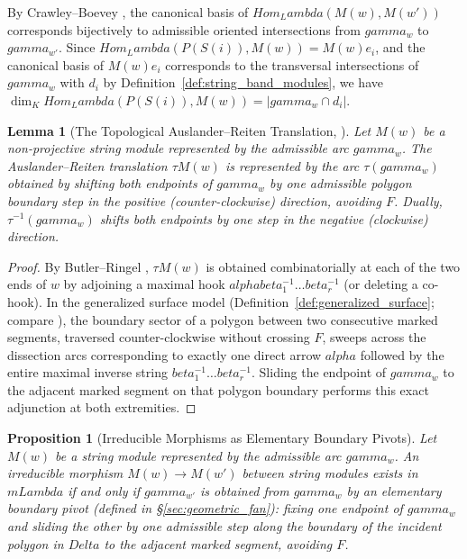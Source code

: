 \documentclass[11pt,a4paper,reqno]{amsart}
\def\mathbb#1{#1}%
\def\operatorname#1{#1}%
\def\K{K}%
\def\forb{F}%
\def\md{m}%
\def\gamma{gamma}%
\def\alpha{alpha}%
\def\beta{beta}%
\def\Delta{Delta}%
\def\Lambda{Lambda}%
\def\emph#1{#1}%
\newtheorem{lemma}[theorem]{Lemma}
\newtheorem{proposition}[theorem]{Proposition}
\theoremstyle{definition}
\theoremstyle{remark}
\newcommand{\K}{\mathbb{K}}
\newcommand{\Hom}{\operatorname{Hom}}
\newcommand{\md}[1]{\operatorname{mod}(#1)}
\newcommand{\forb}{\mathfrak{F}}
\begin{document}
By Crawley--Boevey \cite{CrawleyBoevey1989}, the canonical basis of $\Hom_\Lambda(M(w), M(w'))$ corresponds bijectively to admissible oriented intersections from $\gamma_w$ to $\gamma_{w'}$. Since $\Hom_\Lambda(P(S(i)), M(w)) = M(w)e_i$, and the canonical basis of $M(w)e_i$ corresponds to the transversal intersections of $\gamma_w$ with $d_i$ by Definition~\ref{def:string_band_modules}, we have $\dim_\K \Hom_\Lambda(P(S(i)), M(w)) = |\gamma_w \cap d_i|$.

\begin{lemma}[The Topological Auslander--Reiten Translation, \cite{OPS2018, BCS2020}]
\label{lem:topological_ar}
Let $M(w)$ be a non-projective string module represented by the admissible arc $\gamma_w$. The Auslander--Reiten translation $\tau M(w)$ is represented by the arc $\tau(\gamma_w)$ obtained by shifting both endpoints of $\gamma_w$ by one admissible polygon boundary step in the positive (counter-clockwise) direction, avoiding $\forb$. Dually, $\tau^{-1}(\gamma_w)$ shifts both endpoints by one step in the negative (clockwise) direction.
\end{lemma}

\begin{proof}
By Butler--Ringel \cite{ButlerRingel1987}, $\tau M(w)$ is obtained combinatorially at each of the two ends of $w$ by adjoining a maximal hook $\alpha\beta_1^{-1}\dots\beta_r^{-1}$ (or deleting a co-hook). In the generalized surface model (Definition~\ref{def:generalized_surface}; compare \cite[Lemma~3.6]{BCS2020}), the boundary sector of a polygon between two consecutive marked segments, traversed counter-clockwise without crossing $\forb$, sweeps across the dissection arcs corresponding to exactly one direct arrow $\alpha$ followed by the entire maximal inverse string $\beta_1^{-1}\dots\beta_r^{-1}$. Sliding the endpoint of $\gamma_w$ to the adjacent marked segment on that polygon boundary performs this exact adjunction at both extremities.
\end{proof}

\begin{proposition}[Irreducible Morphisms as Elementary Boundary Pivots]
\label{prop:irreducible_pivot}
Let $M(w)$ be a string module represented by the admissible arc $\gamma_w$. An irreducible morphism $M(w) \to M(w')$ between string modules exists in $\md{\Lambda}$ if and only if $\gamma_{w'}$ is obtained from $\gamma_w$ by an \emph{elementary boundary pivot} (defined in \S\ref{sec:geometric_fan}): fixing one endpoint of $\gamma_w$ and sliding the other by one admissible step along the boundary of the incident polygon in $\Delta$ to the adjacent marked segment, avoiding $\forb$.
\end{proposition}
\end{document}
